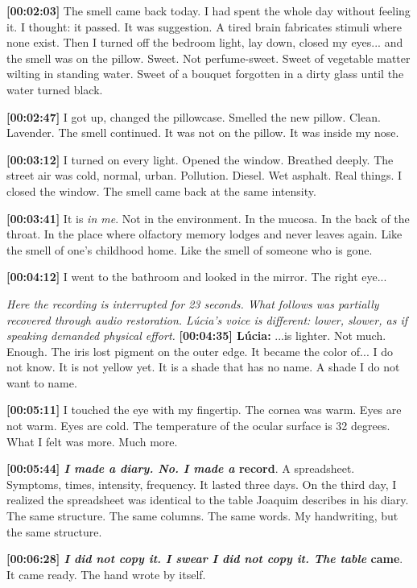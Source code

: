 \noindent \textbf{[00:02:03]} The smell came back today. I had spent the whole day without feeling it. I thought: it passed. It was suggestion. A tired brain fabricates stimuli where none exist. Then I turned off the bedroom light, lay down, closed my eyes... and the smell was on the pillow. Sweet. Not perfume-sweet. Sweet of vegetable matter wilting in standing water. Sweet of a bouquet forgotten in a dirty glass until the water turned black.

\noindent \textbf{[00:02:47]} I got up, changed the pillowcase. Smelled the new pillow. Clean. Lavender. The smell continued. It was not on the pillow. It was inside my nose.

\noindent \textbf{[00:03:12]} I turned on every light. Opened the window. Breathed deeply. The street air was cold, normal, urban. Pollution. Diesel. Wet asphalt. Real things. I closed the window. The smell came back at the same intensity.

\noindent \textbf{[00:03:41]} It is \textit{in me}. Not in the environment. In the mucosa. In the back of the throat. In the place where olfactory memory lodges and never leaves again. Like the smell of one's childhood home. Like the smell of someone who is gone.

\noindent \textbf{[00:04:12]} I went to the bathroom and looked in the mirror. The right eye...

\noindent \textit{Here the recording is interrupted for 23 seconds. What follows was partially recovered through audio restoration. Lúcia's voice is different: lower, slower, as if speaking demanded physical effort.}
\noindent \textbf{[00:04:35] Lúcia:} ...is lighter. Not much. Enough. The iris lost pigment on the outer edge. It became the color of... I do not know. It is not yellow yet. It is a shade that has no name. A shade I do not want to name.

\noindent \textbf{[00:05:11]} I touched the eye with my fingertip. The cornea was warm. Eyes are not warm. Eyes are cold. The temperature of the ocular surface is 32 degrees. What I felt was more. Much more.

\noindent \textbf{[00:05:44]\textit{ I made a diary. No. I made a }record}. A spreadsheet. Symptoms, times, intensity, frequency. It lasted three days. On the third day, I realized the spreadsheet was identical to the table Joaquim describes in his diary. The same structure. The same columns. The same words. My handwriting, but the same structure.

\noindent \textbf{[00:06:28]\textit{ I did not copy it. I swear I did not copy it. The table }came}. It came ready. The hand wrote by itself.

